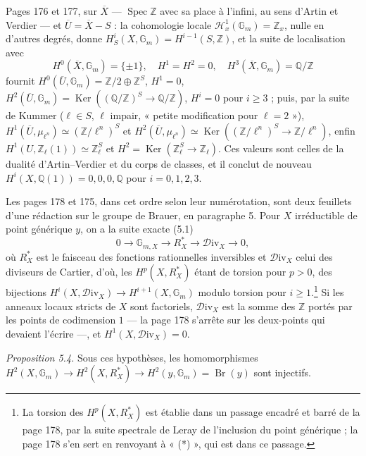 \documentclass[11pt,a4paper]{article}
\begin{document}
Pages 176 et 177, sur $\overline{X}$ --- $\operatorname{Spec} \mathbb{Z}$ avec sa
place à l'infini, au sens d'Artin et Verdier --- et $\overline{U} = \overline{X} -
S$ : la cohomologie locale $\mathcal{H}^{1}_{x}(\mathbb{G}_{m}) = \mathbb{Z}_{x}$,
nulle en d'autres degrés, donne $H^{i}_{S}(X, \mathbb{G}_{m}) = H^{i-1}(S,
\mathbb{Z})$, et la suite de localisation avec
\[
  H^{0}(\overline{X}, \mathbb{G}_{m}) = \{\pm 1\}, \quad H^{1} = H^{2} = 0, \quad
  H^{3}(\overline{X}, \mathbb{G}_{m}) = \mathbb{Q}/\mathbb{Z}
\]
fournit $H^{0}(\overline{U}, \mathbb{G}_{m}) = \mathbb{Z}/2 \oplus
\mathbb{Z}^{S}$, $H^{1} = 0$, $H^{2}(\overline{U}, \mathbb{G}_{m}) =
\operatorname{Ker}((\mathbb{Q}/\mathbb{Z})^{S} \to \mathbb{Q}/\mathbb{Z})$,
$H^{i} = 0$ pour $i \geqslant 3$ ; puis, par la suite de Kummer ($\ell \in S$,
$\ell$ impair, « petite modification pour $\ell = 2$ »),
$H^{1}(\overline{U}, \mu_{\ell^{n}}) \simeq (\mathbb{Z}/\ell^{n})^{S}$ et
$H^{2}(\overline{U}, \mu_{\ell^{n}}) \simeq \operatorname{Ker}
((\mathbb{Z}/\ell^{n})^{S} \to \mathbb{Z}/\ell^{n})$, enfin $H^{1}(U,
\mathbb{Z}_{\ell}(1)) \simeq \mathbb{Z}_{\ell}^{S}$ et $H^{2} =
\operatorname{Ker}(\mathbb{Z}_{\ell}^{S} \to \mathbb{Z}_{\ell})$. Ces valeurs
sont celles de la dualité d'Artin--Verdier et du corps de classes, et il conclut
de nouveau $H^{i}(X, \mathbb{Q}(1)) = 0, 0, 0, \mathbb{Q}$ pour $i = 0, 1, 2,
3$.

Les pages 178 et 175, dans cet ordre selon leur numérotation, sont deux
feuillets d'une rédaction sur le groupe de Brauer, en paragraphe 5. Pour $X$
irréductible de point générique $y$, on a la suite exacte (5.1)
\[
  0 \to \mathbb{G}_{m,X} \to R^{*}_{X} \to \mathcal{D}\mathrm{iv}_{X} \to 0 ,
\]
où $R^{*}_{X}$ est le faisceau des fonctions rationnelles inversibles et
$\mathcal{D}\mathrm{iv}_{X}$ celui des diviseurs de Cartier, d'où, les $H^{p}(X,
R^{*}_{X})$ étant de torsion pour $p > 0$, des bijections $H^{i}(X,
\mathcal{D}\mathrm{iv}_{X}) \to H^{i+1}(X, \mathbb{G}_{m})$ modulo torsion pour $i
\geqslant 1$.\footnote{La torsion des $H^{p}(X, R^{*}_{X})$ est établie dans un
passage encadré et barré de la page 178, par la suite spectrale de Leray de
l'inclusion du point générique ; la page 178 s'en sert en renvoyant à « (*) »,
qui est dans ce passage.} Si les anneaux locaux stricts de $X$ sont factoriels,
$\mathcal{D}\mathrm{iv}_{X}$ est la somme des $\mathbb{Z}$ portés par les points
de codimension $1$ --- la page 178 s'arrête sur les deux-points qui devaient
l'écrire ---, et $H^{1}(X, \mathcal{D}\mathrm{iv}_{X}) = 0$.

\emph{Proposition 5.4.} Sous ces hypothèses, les homomorphismes $H^{2}(X,
\mathbb{G}_{m}) \to H^{2}(X, R^{*}_{X}) \to H^{2}(y, \mathbb{G}_{m}) =
\operatorname{Br}(y)$ sont injectifs.
\end{document}
